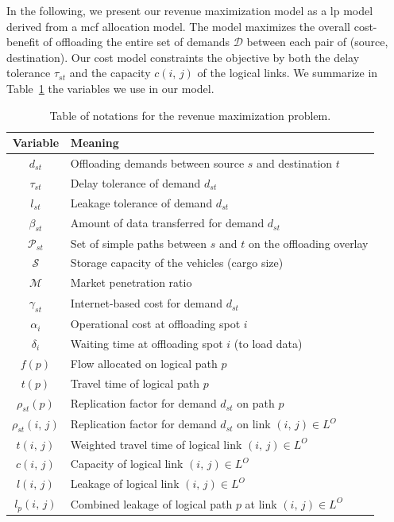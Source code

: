 In the following, we present our revenue maximization model as a \acrlong{lp} model derived from a \acrlong{mcf} allocation model. The model maximizes the overall cost-benefit of offloading the entire set of demands $\mathcal{D}$ between each pair of (source, destination). Our cost model constraints the objective by both the delay tolerance $\tau_{st}$ and the capacity $c(i,\,j)$ of the logical links. We summarize in Table~\ref{tab:main-variables-feas} the variables we use in our model.

\begin{table}[!t]
    \caption{Table of notations for the revenue maximization problem.}
    \renewcommand{\arraystretch}{1.1}
    \centering
    {\footnotesize
    \begin{tabular}{c|l}
        \textbf{Variable} & \textbf{Meaning}\tabularnewline
        \hline 
        $d_{st}$ & Offloading demands between source $s$ and destination $t$\tabularnewline
        $\tau_{st}$ & Delay tolerance of demand $d_{st}$\tabularnewline
        $l_{st}$ & Leakage tolerance of demand $d_{st}$\tabularnewline
        $\beta_{st}$ & Amount of data transferred for demand $d_{st}$\tabularnewline
        $\mathcal{P}_{st}$ & Set of simple paths between $s$ and $t$ on the offloading overlay\tabularnewline
        $\mathcal{S}$ & Storage capacity of the vehicles (cargo size)\tabularnewline
        $\mathcal{M}$ & Market penetration ratio\tabularnewline
        $\gamma_{st}$ & Internet-based cost for demand $d_{st}$\tabularnewline
        $\alpha_{i}$ & Operational cost at offloading spot $i$\tabularnewline
        $\delta_{i}$ & Waiting time at offloading spot $i$ (to load data)\tabularnewline
        $f(p)$ & Flow allocated on logical path $p$\tabularnewline
        $t(p)$ & Travel time of logical path $p$\tabularnewline
        $\rho_{st}(p)$ & Replication factor for demand $d_{st}$ on path $p$\tabularnewline
        $\rho_{st}(i,\,j)$ & Replication factor for demand $d_{st}$ on link $(i,\,j)\in L^{O}$\tabularnewline
        $t(i,\, j)$ & Weighted travel time of logical link $(i,\, j)\in L^{O}$\tabularnewline
        $c(i,\, j)$ & Capacity of logical link $(i,\, j)\in L^{O}$\tabularnewline
        $l(i,\, j)$ & Leakage of logical link $(i,\, j)\in L^{O}$\tabularnewline
        $l_{p}(i,\, j)$ & Combined leakage of logical path $p$ at link $(i,\, j)\in L^{O}$\tabularnewline
    \end{tabular}}
    \label{tab:main-variables-feas}
\end{table}

